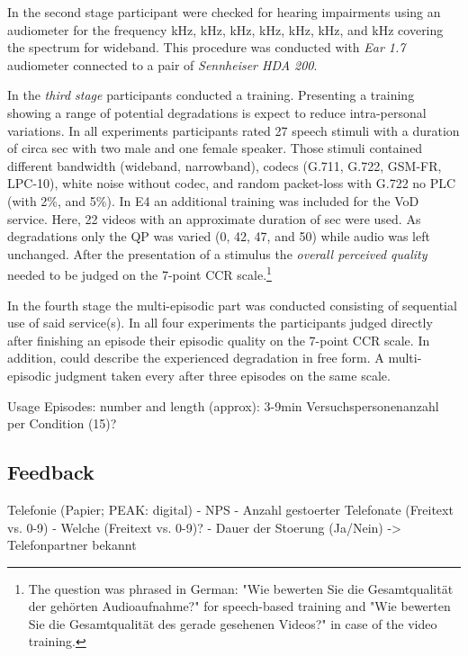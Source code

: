 In the second stage participant were checked for hearing impairments using an audiometer for the frequency \unit[125]{kHz}, \unit[250]{kHz}, \unit[500]{kHz}, \unit[1000]{kHz}, \unit[2000]{kHz}, \unit[4000]{kHz}, and \unit[8000]{kHz} covering the spectrum for wideband.
This procedure was conducted with \emph{Ear 1.7} audiometer connected to a pair of \emph{Sennheiser HDA 200}.

In the \emph{third stage} participants conducted a training.
Presenting a training showing a range of potential degradations is expect to reduce intra-personal variations.
In all experiments participants rated 27 speech stimuli with a duration of circa \unit[8]{sec} with two male and one female speaker.
Those stimuli contained different bandwidth (wideband, narrowband), codecs (G.711, G.722, GSM-FR, LPC-10), white noise without codec, and random packet-loss with G.722 no \ac{PLC} (with 2\%, and 5\%).
In E4 an additional training was included for the \ac{VoD} service.
Here, 22 videos with an approximate duration of \unit[8]{sec} were used.
As degradations only the \ac{QP} was varied (0, 42, 47, and 50) while audio was left unchanged.
After the presentation of a stimulus the \emph{overall perceived quality} needed to be judged on the 7-point \ac{CCR} scale.\footnote{The question was phrased in German: "Wie bewerten Sie die Gesamtqualität der gehörten Audioaufnahme?" for speech-based training and "Wie bewerten Sie die Gesamtqualität des gerade gesehenen Videos?" in case of the video training.}

In the fourth stage the multi-episodic part was conducted consisting of sequential use of said service(s).
In all four experiments the participants judged directly after finishing an episode their episodic quality on the 7-point \ac{CCR} scale.
In addition, could describe the experienced degradation in free form.
A multi-episodic judgment taken every after three episodes on the same scale.

Usage Episodes: number and length (approx): 3-9min
Versuchspersonenanzahl per Condition (15)?




\subsection{Feedback}



Telefonie (Papier; PEAK: digital)
- NPS
- Anzahl gestoerter Telefonate (Freitext vs. 0-9)
- Welche (Freitext vs. 0-9)?
- Dauer der Stoerung (Ja/Nein)
-> Telefonpartner bekannt

